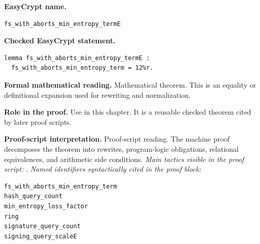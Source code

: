 \begin{formaltheorem}
\noindent\textbf{EasyCrypt name.}
\begin{lstlisting}[language=EasyCrypt,basicstyle=\ttfamily\scriptsize]
fs_with_aborts_min_entropy_termE
\end{lstlisting}
\noindent\textbf{Checked EasyCrypt statement.}
\begin{lstlisting}[language=EasyCrypt,basicstyle=\ttfamily\scriptsize]
lemma fs_with_aborts_min_entropy_termE :
  fs_with_aborts_min_entropy_term = 12%r.
\end{lstlisting}
\noindent\textbf{Formal mathematical reading.}
Mathematical theorem. This is an equality or definitional expansion used for rewriting and normalization.

\noindent\textbf{Role in the proof.}
Use in this chapter. It is a reusable checked theorem cited by later proof scripts.

\noindent\textbf{Proof-script interpretation.}
Proof-script reading. The machine proof decomposes the theorem into rewrites, program-logic obligations, relational equivalences, and arithmetic side conditions.
\emph{Main tactics visible in the proof script:} .
\emph{Named identifiers syntactically cited in the proof block:}
\begin{lstlisting}[language=EasyCrypt,basicstyle=\ttfamily\scriptsize]
fs_with_aborts_min_entropy_term
hash_query_count
min_entropy_loss_factor
ring
signature_query_count
signing_query_scaleE
\end{lstlisting}

\end{formaltheorem}

